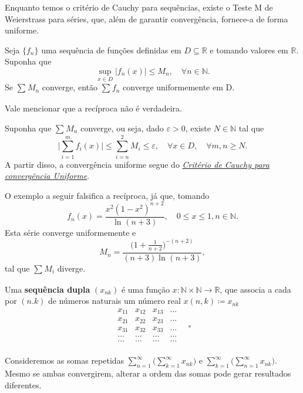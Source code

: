 \documentclass[../analysis_notes.tex]{subfiles}
\begin{document}
Enquanto temos o critério de Cauchy para sequências, existe o Teste M de Weierstrass para séries, que, além de garantir convergência, fornece-a de forma uniforme.
\hypertarget{Weierstrass_M}{
	\begin{theorem*}
		Seja \(\{f_{n}\}\) uma sequência de funções definidas em \(D\subseteq \mathbb{R}\) e tomando valores em \(\mathbb{R}\). Suponha que
		\[
			\sup_{x\in D}|f_{n}(x)|\leq M_{n},\quad \forall n\in \mathbb{N}.
		\]
		Se \(\sum\limits_{}^{}M_{n}\) converge, então \(\sum\limits_{}^{}f_{n}\) converge uniformemente em D.
	\end{theorem*}
}
Vale mencionar que a recíproca não é verdadeira.
\begin{proof*}
	Suponha que \(\sum\limits_{}^{}M_{n}\) converge, ou seja, dado \(\varepsilon >0\), existe \(N\in \mathbb{N}\) tal que
	\[
		\biggl\vert \sum\limits_{i=1}^{m}f_{i}(x) \biggr\vert\leq \sum\limits_{i=n}^{2}M_{i}\leq \varepsilon , \quad \forall x\in D, \quad \forall m, n\geq N.
	\]
	A partir disso, a convergência uniforme segue do \hyperlink{uniform_cauchy}{\textit{Critério de Cauchy para convergência Uniforme}}. \qedsymbol
\end{proof*}
\begin{example}
	O exemplo a seguir falsifica a recíproca, já que, tomando
	\[
		f_{n}(x)=\frac{x^{2}(1-x^{2})^{n+2}}{\ln^{}{(n+3)}},\quad 0\leq x\leq 1, n\in \mathbb{N}.
	\]
	Esta série converge uniformemente e
	\[
		M_{n}=\frac{\biggl(1+\frac{1}{n+2}\biggr)^{-(n+2)}}{(n+3)\ln^{}{(n+3)}},
	\]
	tal que \(\sum\limits_{}^{}M_{i}\) diverge.
\end{example}
\begin{def*}
	Uma \textbf{sequência dupla} \((x_{nk})\) é uma função \(x:\mathbb{N}\times \mathbb{N}\rightarrow \mathbb{R} \), que associa a cada por \((n. k)\) de números naturais um número real \(x(n, k)\coloneqq x_{nk}\)
	\[
		\begin{matrix}
			x_{11} & x_{12} & x_{13} & \dotsc \\
			x_{21} & x_{22} & x_{23} & \dotsc \\
			x_{31} & x_{32} & x_{33} & \dotsc \\
			\dotsc & \dotsc & \dotsc & \dotsc \\
			\dotsc & \dotsc & \dotsc & \dotsc \\
		\end{matrix}\quad \square
	\]
\end{def*}
Consideremos as somas repetidas \(\sum\limits_{n=1}^{\infty}\biggl(\sum\limits_{k=1}^{\infty}x_{nk}\biggr)\) e \(\sum\limits_{k=1}^{\infty}\biggl(\sum\limits_{n=1}^{\infty}x_{nk}\biggr)\). Mesmo se ambas convergirem, alterar a ordem das somas pode gerar resultados diferentes.
\end{document}
